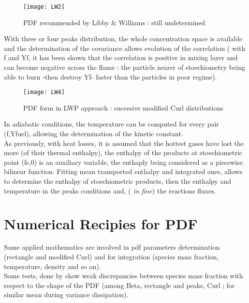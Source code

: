 \begin{figure}[h]
\centerline{\texttt{[image: LW2]}}
\caption{PDF recommended by Libby \& Williams : still undetermined}
\end{figure}
With three or four peaks distribution, the whole concentration space is
available and the determination of the covariance allows evolution of the
correlation ( with f and Yf, it has been shown that the correlation is positive
in mixing layer and can become negative across the flame : the
particle nearer of stoechiometry being able to burn -then destroy Yf- faster than the particles in poor regime). \\
\begin{figure}[ht]
\centerline{\texttt{[image: LW4]}}
\caption{PDF form in LWP approach : succesive modified Curl distributions}
\end{figure}
  
In adiabatic conditions, the temperature can be computed for every pair (f,Yfuel), allowing the determination of the kinetic constant.\\
As previously, with heat losses, it is assumed that the hottest gases have lost
the more (of their thermal enthalpy), the enthalpy of the products at
stoechiometric point (fs,0) is an auxiliary variable, the enthaply being
considered as a piecewise bilinear function. Fitting mean transported enthalpy
and integrated ones, allows to determine the enthalpy of stoechiometric
products, then the enthalpy and temperature in the peaks conditions and, ({\em
  in fine}) the reactions fluxes.

\section*{Numerical Recipies for PDF}
  
Some applied mathematics are involved in pdf parameters determination (rectangle
and modified Curl) and for integration (species
mass fraction, temperature, density and so on).\\
Some tests, done by \cite{7} show weak discrepancies between species mass
fraction with respect to the shape of the PDF (among Beta, rectangle and peaks,
Curl ; for similar mean during variance dissipation).


